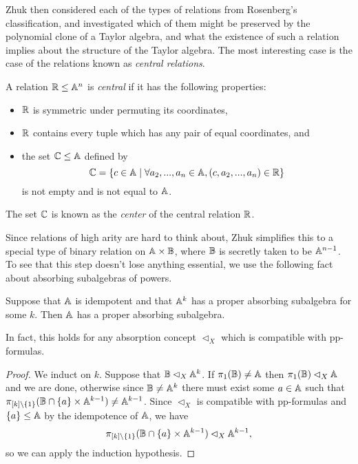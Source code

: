 \documentclass[letterpaper,11pt]{article}
\begin{document}
Zhuk then considered each of the types of relations from Rosenberg's classification, and investigated which of them might be preserved by the polynomial clone of a Taylor algebra, and what the existence of such a relation implies about the structure of the Taylor algebra. The most interesting case is the case of the relations known as \emph{central relations}.

\begin{defn} A relation $\mathbb{R} \le \mathbb{A}^n$ is \emph{central} if it has the following properties:
\begin{itemize}
\item $\mathbb{R}$ is symmetric under permuting its coordinates,
\item $\mathbb{R}$ contains every tuple which has any pair of equal coordinates, and
\item the set $\mathbb{C} \le \mathbb{A}$ defined by
\[
\mathbb{C} = \{c \in \mathbb{A} \mid \forall a_2, ..., a_n \in \mathbb{A}, (c,a_2,...,a_n) \in \mathbb{R}\}
\]
is not empty and is not equal to $\mathbb{A}$.
\end{itemize}
The set $\mathbb{C}$ is known as the \emph{center} of the central relation $\mathbb{R}$.
\end{defn}

Since relations of high arity are hard to think about, Zhuk simplifies this to a special type of binary relation on $\mathbb{A} \times \mathbb{B}$, where $\mathbb{B}$ is secretly taken to be $\mathbb{A}^{n-1}$. To see that this step doesn't lose anything essential, we use the following fact about absorbing subalgebras of powers.

\begin{prop} Suppose that $\mathbb{A}$ is idempotent and that $\mathbb{A}^k$ has a proper absorbing subalgebra for some $k$. Then $\mathbb{A}$ has a proper absorbing subalgebra.

In fact, this holds for any absorption concept $\lhd_X$ which is compatible with pp-formulas.
\end{prop}
\begin{proof} We induct on $k$. Suppose that $\mathbb{B} \lhd_X \mathbb{A}^k$. If $\pi_1(\mathbb{B}) \ne \mathbb{A}$ then $\pi_1(\mathbb{B}) \lhd_X \mathbb{A}$ and we are done, otherwise since $\mathbb{B} \ne \mathbb{A}^k$ there must exist some $a \in \mathbb{A}$ such that $\pi_{[k]\setminus\{1\}}(\mathbb{B} \cap \{a\} \times \mathbb{A}^{k-1}) \ne \mathbb{A}^{k-1}$. Since $\lhd_X$ is compatible with pp-formulas and $\{a\} \le \mathbb{A}$ by the idempotence of $\mathbb{A}$, we have
\[
\pi_{[k]\setminus\{1\}}(\mathbb{B} \cap \{a\} \times \mathbb{A}^{k-1}) \lhd_X \mathbb{A}^{k-1},
\]
so we can apply the induction hypothesis.
\end{proof}
\end{document}
